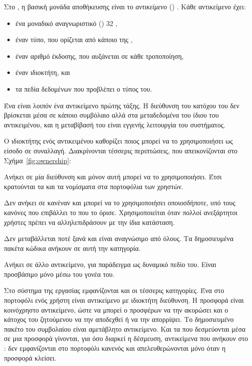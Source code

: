 Στο , η βασική μονάδα αποθήκευσης είναι το \emph{αντικείμενο} ()
\cite{sui-object-model}. Κάθε αντικείμενο έχει:
\begin{itemize}[nosep]
  \item ένα μοναδικό αναγνωριστικό () 32 ,
  \item έναν τύπο, που ορίζεται από κάποιο  της ,
  \item έναν αριθμό έκδοσης, που αυξάνεται σε κάθε τροποποίηση,
  \item έναν ιδιοκτήτη, και
  \item τα πεδία δεδομένων που προβλέπει ο τύπος του.
\end{itemize}
Ένα  είναι λοιπόν ένα αντικείμενο πρώτης τάξης. Η διεύθυνση του κατόχου του δεν
βρίσκεται μέσα σε κάποιο συμβόλαιο αλλά στα μεταδεδομένα του ίδιου του αντικειμένου, και η
μεταβίβασή του είναι εγγενής λειτουργία του συστήματος.

Ο ιδιοκτήτης ενός αντικειμένου καθορίζει ποιος μπορεί να το χρησιμοποιήσει ως είσοδο σε
συναλλαγή. Διακρίνονται τέσσερις περιπτώσεις, που απεικονίζονται στο
Σχήμα~\ref{fig:ownership}:

\begin{description}[leftmargin=1.2em,itemsep=2pt]
  \item[Αντικείμενο διεύθυνσης (\en{address-owned}).] Ανήκει σε μία διεύθυνση και μόνον
    αυτή μπορεί να το χρησιμοποιήσει. Έτσι κρατούνται τα  και τα νομίσματα στα
    πορτοφόλια των χρηστών.
  \item[Κοινόχρηστο αντικείμενο (\en{shared}).] Δεν ανήκει σε κανέναν και μπορεί να το
    χρησιμοποιήσει οποιοσδήποτε, υπό τους κανόνες που επιβάλλει το  που το
    όρισε. Χρησιμοποιείται όταν πολλοί ανεξάρτητοι χρήστες πρέπει να αλληλεπιδράσουν με την
    ίδια κατάσταση.
  \item[Αμετάβλητο αντικείμενο (\en{immutable}).] Δεν μεταβάλλεται ποτέ ξανά και είναι
    αναγνώσιμο από όλους. Τα δημοσιευμένα πακέτα κώδικα ανήκουν σε αυτή την κατηγορία.
  \item[Αντικείμενο αντικειμένου (\en{object-owned}).] Ανήκει σε άλλο αντικείμενο, για
    παράδειγμα ως δυναμικό πεδίο του. Είναι προσβάσιμο μόνο μέσω του γονέα του.
\end{description}

Στο σύστημα της εργασίας εμφανίζονται και οι τέσσερις κατηγορίες. Ένα  στο
πορτοφόλι ενός χρήστη είναι αντικείμενο με ιδιοκτήτη διεύθυνση. Η προσφορά  είναι
κοινόχρηστο αντικείμενο, ώστε να μπορεί ο προσφέρων να την ακυρώσει και ο κάτοχος του
ζητούμενου  να την αποδεχθεί ή να την απορρίψει. Το δημοσιευμένο πακέτο του
συμβολαίου είναι αμετάβλητο αντικείμενο. Και τα  που δεσμεύονται μέσα σε μια
προσφορά γίνονται, για όσο διαρκεί η δέσμευση, αντικείμενα που ανήκουν στο : δεν
εμφανίζονται στο πορτοφόλι κανενός και απελευθερώνονται μόνο όταν η προσφορά κλείσει.


